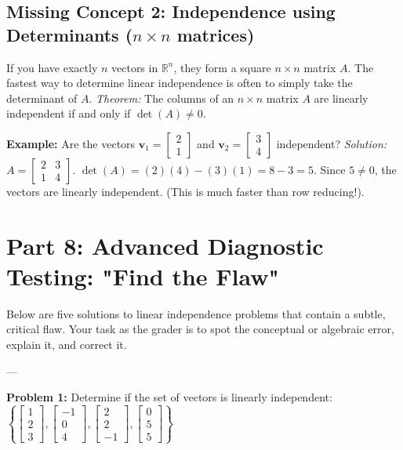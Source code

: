 \documentclass[11pt]{article}
\begin{document}
\subsection{Missing Concept 2: Independence using Determinants ($n \times n$ matrices)}
If you have exactly $n$ vectors in $\mathbb{R}^n$, they form a square $n \times n$ matrix $A$. The fastest way to determine linear independence is often to simply take the determinant of $A$. 
\textit{Theorem:} The columns of an $n \times n$ matrix $A$ are linearly independent if and only if $\det(A) \neq 0$.

\textbf{Example:} Are the vectors $\mathbf{v}_1 = \begin{bmatrix} 2 \\ 1 \end{bmatrix}$ and $\mathbf{v}_2 = \begin{bmatrix} 3 \\ 4 \end{bmatrix}$ independent?
\textit{Solution:}
$A = \begin{bmatrix} 2 & 3 \\ 1 & 4 \end{bmatrix}$. 
$\det(A) = (2)(4) - (3)(1) = 8 - 3 = 5$. 
Since $5 \neq 0$, the vectors are linearly independent. (This is much faster than row reducing!).

\newpage

\section{Part 8: Advanced Diagnostic Testing: "Find the Flaw"}

Below are five solutions to linear independence problems that contain a subtle, critical flaw. Your task as the grader is to spot the conceptual or algebraic error, explain it, and correct it.

---

\textbf{Problem 1:} Determine if the set of vectors is linearly independent: 
$\left\{ \begin{bmatrix} 1 \\ 2 \\ 3 \end{bmatrix}, \begin{bmatrix} -1 \\ 0 \\ 4 \end{bmatrix}, \begin{bmatrix} 2 \\ 2 \\ -1 \end{bmatrix}, \begin{bmatrix} 0 \\ 5 \\ 5 \end{bmatrix} \right\}$
\end{document}
